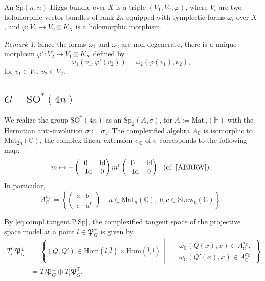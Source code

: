 \documentclass[oneside,11pt]{amsart}
\theoremstyle{definition}
\theoremstyle{remark}
\newtheorem{rem}[thm]{Remark}
\newcommand{\midwd}{\,\middle\vert\,}
\numberwithin{thm}{section}
\numberwithin{equation}{section}
\begin{document}
    An $\mathrm{Sp}(n,n)$-Higgs bundle over $X$ is a triple $(V_1,V_2,\varphi)$, where $V_i$ are two holomorphic vector bundles of rank $2n$ equipped with symplectic forms $\omega_i$ over $X$, and $\varphi\colon V_1\to V_2\otimes K_X$ is a holomorphic morphism.


\begin{rem}
    Since the forms $\omega_1$ and $\omega_2$ are non-degenerate, there is a unique morphism $\varphi'\colon V_2\to V_1\otimes K_X$ defined by   \begin{equation}\label{eq:sp(n,n)-higgs}
   \omega_1(v_1,\varphi'(v_2))=\omega_2(\varphi(v_1),v_2),   \end{equation}
   for $v_1\in V_1$, $v_2\in V_2$. 
    
\end{rem}


\subsection{\texorpdfstring{$G=\mathrm{SO}^*(4n)$}{G=SO*(4n)}}

We realize the group $\mathrm{SO}^*(4n)$ as an $\mathrm{Sp}_2(A,\sigma)$, for $A:=\mathrm{Mat}_n(\mathbb{H})$ with the Hermitian  anti-involution $\sigma:=\sigma_1$. The complexified algebra $A_\mathbb C$ is isomorphic to $\mathrm{Mat}_{2n}(\mathbb C)$, the complex linear extension $\sigma_\mathbb C$ of $\sigma$ corresponds to the following map: 
$$m\mapsto -\begin{pmatrix}
0 & \mathrm{Id}\\
-\mathrm{Id} & 0
\end{pmatrix} m^t \begin{pmatrix}
0 & \mathrm{Id}\\
-\mathrm{Id} & 0
\end{pmatrix}\ \ (\text{cf.~\cite[Appendix B.1.2]{ABRRW}}).$$ In particular, \[A_\mathbb C^{\sigma_\mathbb C}=\left\{\begin{pmatrix} a & b \\ c& a^t\end{pmatrix}\midwd a\in\mathrm{Mat}_{n}(\mathbb C),\; b,c\in\mathrm{Skew}_{n}(\mathbb C)\right\}.\]

By \eqref{eq:compl.tangent.P.Sp}, the complexified tangent space of the projective space model at a point $l\in\mathfrak{P}_G^\pm$ is given by
\begin{align*}
    T_l^\mathbb C\mathfrak{P}_G^\pm&=\left\{(Q,Q')\in\mathrm{Hom}(l,\bar l)\times \mathrm{Hom}(\bar l,l)\midwd
    \begin{aligned}
       &\ \omega_{\mathbb C}(Q(x),x)\in A^{\sigma_\mathbb C}_\mathbb C,\\ 
       &\ \omega_{\mathbb C}(Q'(x),x)\in A^{\sigma_\mathbb C}_\mathbb C
    \end{aligned}\right\} \\
    &=T_l\mathfrak{P}_G^\pm\oplus T_{\bar l}\mathfrak{P}_G^\mp.
\end{align*}
\end{document}
